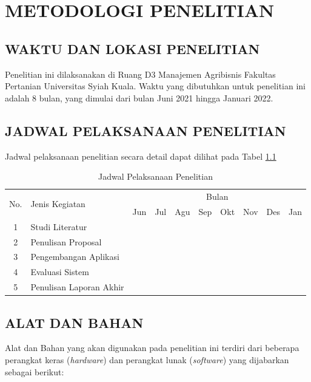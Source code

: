 \fancyhf{} 
\fancyfoot[C]{\thepage}
\chapter{METODOLOGI PENELITIAN}

\section{\uppercase{WAKTU DAN LOKASI PENELITIAN}}
Penelitian ini dilaksanakan di Ruang D3 Manajemen Agribisnis Fakultas Pertanian Universitas Syiah Kuala. Waktu yang dibutuhkan untuk penelitian ini adalah 8 bulan, yang dimulai dari bulan Juni 2021 hingga Januari 2022.

\section{\uppercase{JADWAL PELAKSANAAN PENELITIAN}}
Jadwal pelaksanaan penelitian secara detail dapat dilihat pada Tabel \ref{tab:jadwal}

\begin{table}[H]
	\begin{center}
	\caption{Jadwal Pelaksanaan Penelitian}
	\label{tab:jadwal}
	\begin{tabular}{|c|l|c|c|c|c|c|c|c|c|}
	\hline
	\multirow{2}{*}{No.}&\multirow{2}{*}{Jenis Kegiatan}&\multicolumn{8}{c|}{Bulan}\\
	\cline{3-10}
	&&Jun&Jul&Agu&Sep&Okt&Nov&Des&Jan\\
	\hline
	1&Studi Literatur&\cellcolor{gray}&\cellcolor{gray}&&&&&&\\
	\hline
	2&Penulisan Proposal&&&\cellcolor{gray}&\cellcolor{gray}&&&&\\
	\hline
	3&Pengembangan Aplikasi&&&\cellcolor{gray}&\cellcolor{gray}&\cellcolor{gray}&&&\\
	\hline
	4&Evaluasi Sistem&&&&&&\cellcolor{gray}&\cellcolor{gray}&\\
	\hline
	5&Penulisan Laporan Akhir&&&&&&&&\cellcolor{gray}\\
	\hline
	\end{tabular}
	\end{center}
\end{table}

\section{\uppercase{ALAT DAN BAHAN}}
Alat dan Bahan yang akan digunakan pada penelitian ini terdiri dari beberapa perangkat keras (\textit{hardware}) dan perangkat lunak (\textit{software}) yang dijabarkan sebagai berikut:

